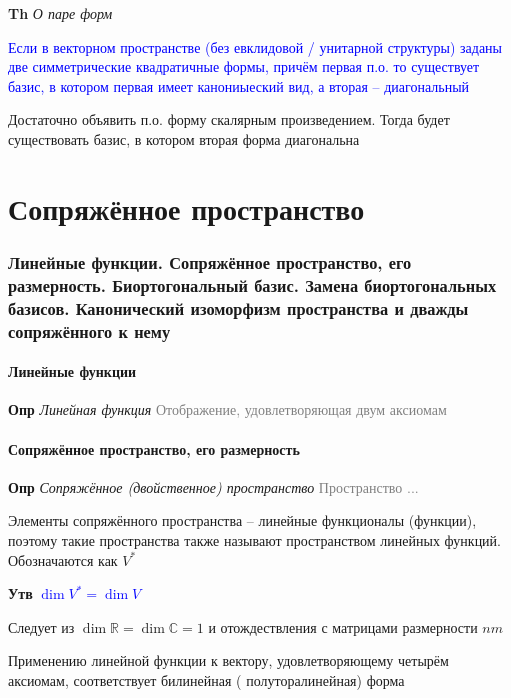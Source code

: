 \documentclass[a4paper, 14pt]{article}
\begin{document}
    \textbf{Th} \textit{О паре форм}
    
    \textcolor{blue}{Если в векторном пространстве (без евклидовой / унитарной структуры) заданы две симметрические
    квадратичные формы, причём первая п.о. то существует базис, в котором первая имеет канониыеский вид, а вторая --
    диагональный}
    
    Достаточно объявить п.о. форму скалярным произведением.
    Тогда будет существовать базис, в котором вторая форма диагональна
    
     \part*{Сопряжённое пространство}
    
    \section{Линейные функции.
    Сопряжённое пространство, его размерность.
    Биортогональный базис.
    Замена биортогональных базисов.
    Канонический изоморфизм пространства и дважды сопряжённого к нему}
    
    \subsection{Линейные функции}
    
    \textbf{Опр} \textit{Линейная функция} \textcolor{gray}{Отображение, удовлетворяющая двум аксиомам}
    
    \subsection{Сопряжённое пространство, его размерность}
    
    \textbf{Опр} \textit{Сопряжённое (двойственное) пространство} \textcolor{gray}{Пространство ...}
    
    Элементы сопряжённого пространства -- линейные функционалы (функции), поэтому такие пространства также называют
    пространством линейных функций.
    Обозначаются как $V^*$
    
    \textbf{Утв} \textcolor{blue}{$\dim V^* = \dim V$}
    
    Следует из $\dim \mathbb{R} = \dim \mathbb{C} = 1$ и отождествления с матрицами размерности $nm$
    
    Применению линейной функции к вектору, удовлетворяющему четырём аксиомам, соответствует билинейная (
    полуторалинейная) форма
    
\end{document}
